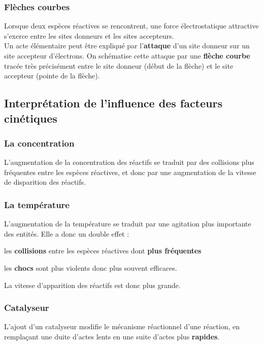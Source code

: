 \documentclass[a4paper,13pt,fleqn]{scrartcl}%
\begin{document}
        \subsubsection{Flèches courbes}
Lorsque deux espèces réactives se rencontrent, une force électrostatique attractive s'exerce entre les sites donneurs et les sites accepteurs.\\
Un acte élémentaire peut être expliqué par l'\textbf{attaque} d'un site donneur sur un site accepteur d'électrons. On schématise cette attaque par une \textbf{flèche courbe} tracée très précisément entre le site donneur (début de la flèche) et le site accepteur (pointe de la flèche).

\subsection{Interprétation de l'influence des facteurs cinétiques}
    \subsubsection{La concentration}
L'augmentation de la concentration des réactifs se traduit par des collisions plus fréquentes entre les espèces réactives, et donc par une augmentation de la vitesse de disparition des réactifs.
    \subsubsection{La température}
L'augmentation de la température se traduit par une agitation plus importante des entités. Elle a donc un double effet :
\begin{itemize*}
    \item les \textbf{collisions} entre les espèces réactives dont  \textbf{plus fréquentes}
    \item les \textbf{chocs} sont plus violents donc plus souvent efficaces.
\end{itemize*}
La vitesse d'apparition des réactifs est donc plus grande.
    \subsubsection{Catalyseur}
L'ajout d'un catalyseur modifie le mécanisme réactionnel d'une réaction, en remplaçant une duite d'actes lents en une suite d'actes plus \textbf{rapides}.
\end{document}
